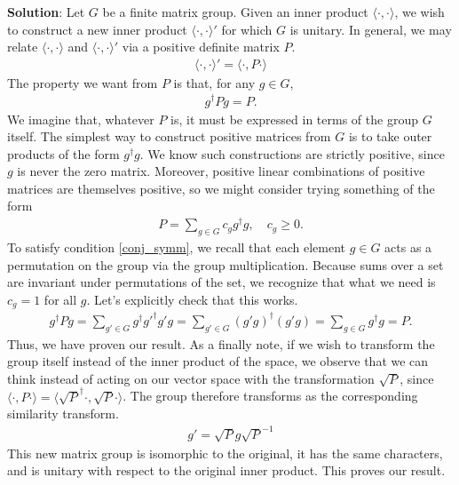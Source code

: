 \documentclass{book}
\newcommand{\innerprod}[2]{\langle#1,#2\rangle}
\begin{document}
    \textbf{Solution}: Let $G$ be a finite matrix group. Given an inner product $\innerprod{\cdot}{\cdot}$, we wish to construct a new inner product $\innerprod{\cdot}{\cdot}'$ for which $G$ is unitary. In general, we may relate $\innerprod{\cdot}{\cdot}$ and $\innerprod{\cdot}{\cdot}'$ via a positive definite matrix $P$.
    \begin{align}
        \innerprod{\cdot}{\cdot}' = \innerprod{\cdot}{P\cdot}
    \end{align}
    The property we want from $P$ is that, for any $g\in G$,
    \begin{align} \label{conj_symm}
        g^\dagger P g = P.
    \end{align}
    We imagine that, whatever $P$ is, it must be expressed in terms of the group $G$ itself. The simplest way to construct positive matrices from $G$ is to take outer products of the form $g^\dagger g$. We know such constructions are strictly positive, since $g$ is never the zero matrix. Moreover, positive linear combinations of positive matrices are themselves positive, so we might consider trying something of the form
    \begin{align}
        P = \sum_{g\in G} c_g g^\dagger g, \quad c_g\geq 0.
    \end{align}
    To satisfy condition \eqref{conj_symm}, we recall that each element $g\in G$ acts as a permutation on the group via the group multiplication. Because sums over a set are invariant under permutations of the set, we recognize that what we need is $c_g=1$ for all $g$. Let's explicitly check that this works.
    \begin{align}
        g^\dagger P g = \sum_{g'\in G} g^\dagger g'^\dagger g' g = \sum_{g'\in G} (g'g)^\dagger (g'g) = \sum_{g\in G} g^\dagger g = P.
    \end{align}
    Thus, we have proven our result. As a finally note, if we wish to transform the group itself instead of the inner product of the space, we observe that we can think instead of acting on our vector space with the transformation $\sqrt{P}$, since $\innerprod{\cdot}{P\cdot} = \innerprod{\sqrt{P}^\dagger\cdot}{\sqrt{P}\cdot}$. The group therefore transforms as the corresponding similarity transform.
    \begin{align}
        g' = \sqrt{P}g \sqrt{P}^{-1}
    \end{align}
    This new matrix group is isomorphic to the original, it has the same characters, and is unitary with respect to the original inner product. This proves our result. 
    
\end{document}
